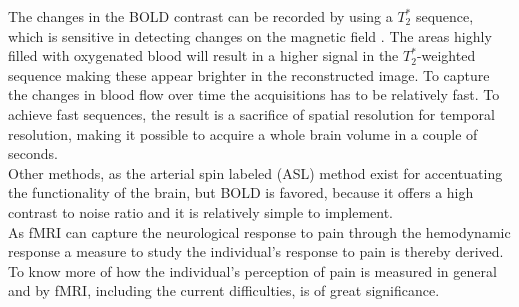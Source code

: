 The changes in the BOLD contrast can be recorded by using a $T_{2}^*$ sequence, which is sensitive in detecting changes on the magnetic field \cite{Khanna2015,Lee2002}. The areas highly filled with oxygenated blood will result in a higher signal in the $T_{2}^*$-weighted sequence making these appear brighter in the reconstructed image. To capture the changes in blood flow over time the acquisitions has to be relatively fast. To achieve fast sequences, the result is a sacrifice of spatial resolution for temporal resolution, making it possible to acquire a whole brain volume in a couple of seconds. \cite{Khanna2015} \\ 
Other methods, as the arterial spin labeled (ASL) method exist for accentuating the functionality of the brain, but BOLD is favored, because it offers a high contrast to noise ratio and it is relatively simple to implement. \cite{Lee2002} \\ As fMRI can capture the neurological response to pain through the hemodynamic response a measure to study the individual's response to pain is thereby derived. To know more of how the individual's perception of pain is measured in general and by fMRI, including the current difficulties, is of great significance.    
